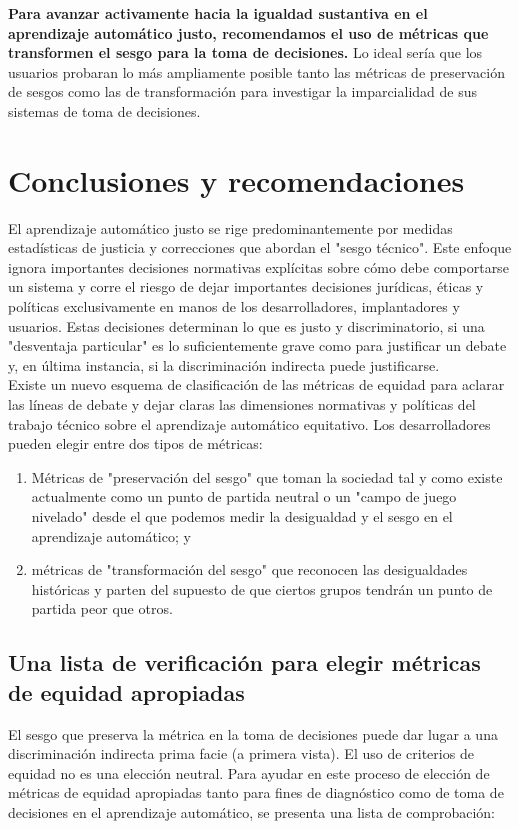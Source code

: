 \textbf{Para avanzar activamente hacia la igualdad sustantiva en el aprendizaje automático justo, recomendamos el uso de métricas que transformen el sesgo para la toma de decisiones.} Lo ideal sería que los usuarios probaran lo más ampliamente posible tanto las métricas de preservación de sesgos como las de transformación para investigar la imparcialidad de sus sistemas de toma de decisiones.

\section{Conclusiones y recomendaciones}
El aprendizaje automático justo se rige predominantemente por medidas estadísticas de justicia y correcciones que abordan el "sesgo técnico". Este enfoque ignora importantes decisiones normativas explícitas sobre cómo debe comportarse un sistema y corre el riesgo de dejar importantes decisiones jurídicas, éticas y políticas exclusivamente en manos de los desarrolladores, implantadores y usuarios. Estas decisiones determinan lo que es justo y discriminatorio, si una "desventaja particular" es lo suficientemente grave como para justificar un debate y, en última instancia, si la discriminación indirecta puede justificarse.\\

Existe un nuevo esquema de clasificación de las métricas de equidad para aclarar las líneas de debate y dejar claras las dimensiones normativas y políticas del trabajo técnico sobre el aprendizaje automático equitativo. Los desarrolladores pueden elegir entre dos tipos de métricas: 
\begin{enumerate}[1.]
    \item Métricas de "preservación del sesgo" que toman la sociedad tal y como existe actualmente como un punto de partida neutral o un "campo de juego nivelado" desde el que podemos medir la desigualdad y el sesgo en el aprendizaje automático; y 
    \item métricas de "transformación del sesgo" que reconocen las desigualdades históricas y parten del supuesto de que ciertos grupos tendrán un punto de partida peor que otros.
\end{enumerate}

\subsection{Una lista de verificación para elegir métricas de equidad apropiadas}
El sesgo que preserva la métrica en la toma de decisiones puede dar lugar a una discriminación indirecta prima facie (a primera vista). El uso de criterios de equidad no es una elección neutral. 
Para ayudar en este proceso de elección de métricas de equidad apropiadas tanto para fines de diagnóstico como de toma de decisiones en el aprendizaje automático, se presenta una lista de comprobación:

